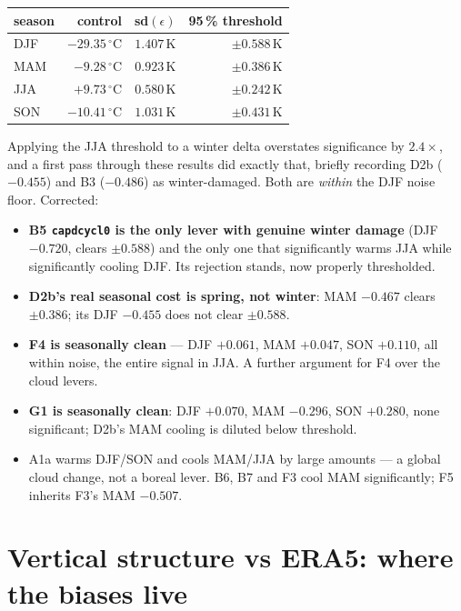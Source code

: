 \documentclass[10pt]{article}
\begin{document}
\begin{center}\footnotesize
\begin{tabular}{l r r r}
\toprule
season & control & sd$(\epsilon)$ & 95\,\% threshold \\
\midrule
DJF & $-29.35\,^\circ$C & $1.407$\,K & $\pm 0.588$\,K \\
MAM & $-9.28\,^\circ$C & $0.923$\,K & $\pm 0.386$\,K \\
JJA & $+9.73\,^\circ$C & $0.580$\,K & $\pm 0.242$\,K \\
SON & $-10.41\,^\circ$C & $1.031$\,K & $\pm 0.431$\,K \\
\bottomrule
\end{tabular}
\end{center}

\noindent Applying the JJA threshold to a winter delta overstates significance by $2.4\times$,
and a first pass through these results did exactly that, briefly recording D2b ($-0.455$) and
B3 ($-0.486$) as winter-damaged. Both are \emph{within} the DJF noise floor. Corrected:

\begin{itemize}\itemsep2pt
\item \textbf{B5 \texttt{capdcycl0} is the only lever with genuine winter damage}
  (DJF $-0.720$, clears $\pm0.588$) and the only one that significantly warms JJA while
  significantly cooling DJF. Its rejection stands, now properly thresholded.
\item \textbf{D2b's real seasonal cost is spring, not winter}: MAM $-0.467$ clears
  $\pm0.386$; its DJF $-0.455$ does not clear $\pm0.588$.
\item \textbf{F4 is seasonally clean} --- DJF $+0.061$, MAM $+0.047$, SON $+0.110$, all within
  noise, the entire signal in JJA. A further argument for F4 over the cloud levers.
\item \textbf{G1 is seasonally clean}: DJF $+0.070$, MAM $-0.296$, SON $+0.280$, none
  significant; D2b's MAM cooling is diluted below threshold.
\item A1a warms DJF/SON and cools MAM/JJA by large amounts --- a global cloud change, not a
  boreal lever. B6, B7 and F3 cool MAM significantly; F5 inherits F3's MAM $-0.507$.
\end{itemize}

\section{Vertical structure vs ERA5: where the biases live}\label{sec:vprof}
\end{document}
